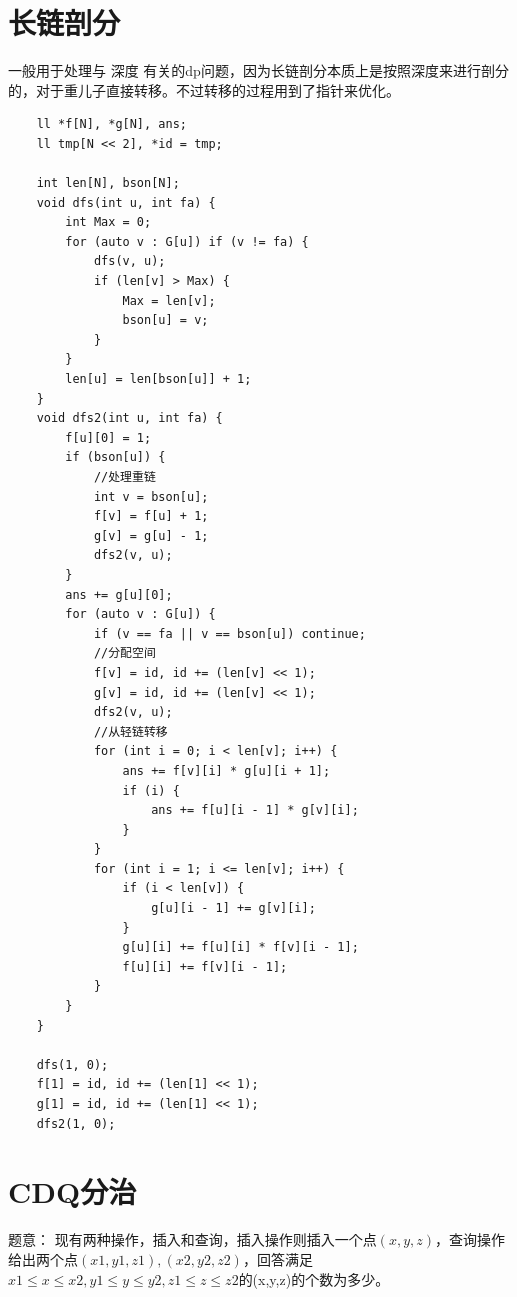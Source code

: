 \documentclass[a4paper,11pt,twoside,fontset = fandol,UTF8]{ctexbook} %
\begin{document}
	\section{长链剖分}
	
	一般用于处理与 深度 有关的dp问题，因为长链剖分本质上是按照深度来进行剖分的，对于重儿子直接转移。不过转移的过程用到了指针来优化。
	
	\begin{lstlisting}
	ll *f[N], *g[N], ans;
	ll tmp[N << 2], *id = tmp;
	
	int len[N], bson[N];
	void dfs(int u, int fa) {
	    int Max = 0;
	    for (auto v : G[u]) if (v != fa) {
	        dfs(v, u);
	        if (len[v] > Max) {
	            Max = len[v];
	            bson[u] = v;
	        }
	    }
	    len[u] = len[bson[u]] + 1;
	}
	void dfs2(int u, int fa) {
	    f[u][0] = 1;
	    if (bson[u]) {
	        //处理重链
	        int v = bson[u];
	        f[v] = f[u] + 1;
	        g[v] = g[u] - 1;
	        dfs2(v, u);
	    }
	    ans += g[u][0];
	    for (auto v : G[u]) {
	        if (v == fa || v == bson[u]) continue;
	        //分配空间
	        f[v] = id, id += (len[v] << 1);
	        g[v] = id, id += (len[v] << 1);
	        dfs2(v, u);
	        //从轻链转移
	        for (int i = 0; i < len[v]; i++) {
	            ans += f[v][i] * g[u][i + 1];
	            if (i) {
	                ans += f[u][i - 1] * g[v][i];
	            }
	        }
	        for (int i = 1; i <= len[v]; i++) {
	            if (i < len[v]) {
	                g[u][i - 1] += g[v][i];
	            }
	            g[u][i] += f[u][i] * f[v][i - 1];
	            f[u][i] += f[v][i - 1];
	        }
	    }
	}
	
	dfs(1, 0);
	f[1] = id, id += (len[1] << 1);
	g[1] = id, id += (len[1] << 1);
	dfs2(1, 0);
	\end{lstlisting}
	
	\section{CDQ分治}
	题意：
	现有两种操作，插入和查询，插入操作则插入一个点$(x,y,z)$，查询操作给出两个点$(x1,y1,z1),(x2,y2,z2)$，回答满足$x1≤x≤x2,y1≤y≤y2,z1≤z≤z2$的(x,y,z)的个数为多少。
	
\end{document}
